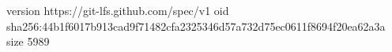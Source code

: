 version https://git-lfs.github.com/spec/v1
oid sha256:44b1f6017b913cad9f71482cfa2325346d57a732d75ec0611f8694f20ea62a3a
size 5989
